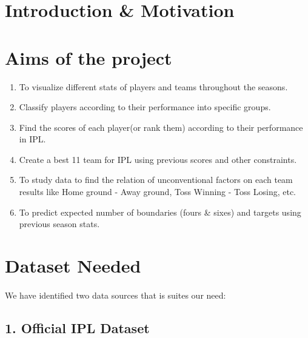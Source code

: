 \documentclass[12pt]{article}
\begin{document}
\section*{Introduction \& Motivation}



\section*{Aims of the project}
\begin{enumerate}
\item To visualize different stats of players and teams throughout the seasons.
\item Classify players according to their performance into specific groups.
\item Find the scores of each player(or rank them) according to their performance in IPL.
\item Create a best 11 team for IPL using previous scores and other constraints.
\item To study data to find the relation of unconventional factors on each team results like Home ground - Away ground, Toss Winning - Toss Losing, etc.
\item To predict expected number of boundaries (fours \& sixes) and targets using previous season stats.
\end{enumerate}



\section*{Dataset Needed}
\paragraph{}
We have identified two data sources that is suites our need:

	\subsection*{1. Official IPL Dataset}
	
\end{document}
